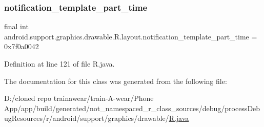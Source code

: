 \subsubsection{\texorpdfstring{notification\_template\_part\_time}{notification\_template\_part\_time}}
{\footnotesize\ttfamily final int android.\+support.\+graphics.\+drawable.\+R.\+layout.\+notification\+\_\+template\+\_\+part\+\_\+time = 0x7f0a0042\hspace{0.3cm}{\ttfamily [static]}}



Definition at line 121 of file R.\+java.



The documentation for this class was generated from the following file\+:\begin{DoxyCompactItemize}
\item 
D\+:/cloned repo trainawear/train-\/\+A-\/wear/\+Phone App/app/build/generated/not\+\_\+namespaced\+\_\+r\+\_\+class\+\_\+sources/debug/process\+Debug\+Resources/r/android/support/graphics/drawable/\mbox{\hyperlink{process_debug_resources_2r_2android_2support_2graphics_2drawable_2_r_8java}{R.\+java}}\end{DoxyCompactItemize}
